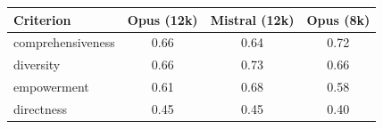\begin{tabular}{lccc}
\toprule
Criterion & Opus (12k) & Mistral (12k) & Opus (8k) \\
\midrule
comprehensiveness & 0.66 & 0.64 & 0.72 \\
diversity & 0.66 & 0.73 & 0.66 \\
empowerment & 0.61 & 0.68 & 0.58 \\
directness & 0.45 & 0.45 & 0.40 \\
\bottomrule
\end{tabular}
